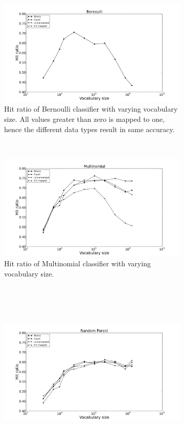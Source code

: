 \newcommand{\figwidth}{0.49\textwidth}
\begin{figure}[H]
	\centering
	\begin{subfigure}[b]{\figwidth}
		\includegraphics[width=\textwidth]{img/Bernoulli-hitrate-eps-converted-to.pdf}
		\caption{Hit ratio of Bernoulli classifier with varying vocabulary size. All values greater than zero is mapped to one, hence the different data types result in same accuracy.}
		\label{fig:hitratio-nb}
	\end{subfigure}
	~
	\begin{subfigure}[b]{\figwidth}
		\includegraphics[width=\textwidth]{img/Multinomial-hitrate-eps-converted-to.pdf}
		\caption{Hit ratio of Multinomial classifier with varying vocabulary size.\\\ \\\ }
		\label{fig:hitratio-mn}
	\end{subfigure}
	\\
	\begin{subfigure}[b]{\figwidth}
		\includegraphics[width=\textwidth]{img/Random-Forest-hitrate-eps-converted-to.pdf}

\end{subfigure}
\end{figure}
